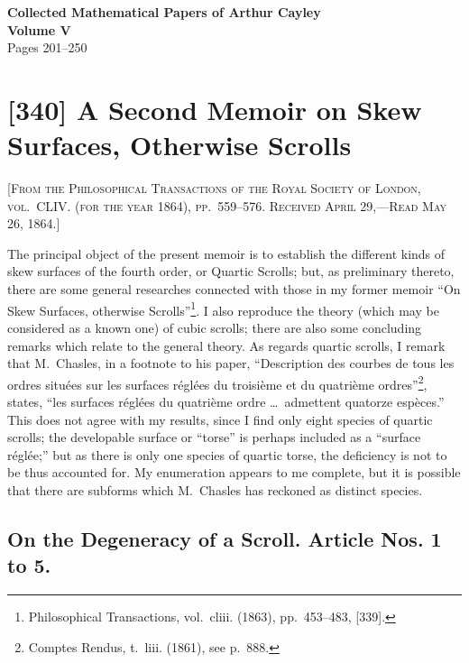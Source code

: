 \documentclass[12pt,a4paper]{article}
\theoremstyle{definition}
\begin{document}
\begin{center}
\LARGE\textbf{Collected Mathematical Papers of Arthur Cayley}\\[6pt]
\Large\textbf{Volume V}\\[12pt]
\large Pages 201--250\\[24pt]
\end{center}

\tableofcontents
\newpage

\section{[340] A Second Memoir on Skew Surfaces, Otherwise Scrolls}

\begin{center}
\textsc{[From the Philosophical Transactions of the Royal Society of London, vol.~CLIV. (for the year 1864), pp.~559--576. Received April 29,---Read May 26, 1864.]}
\end{center}

The principal object of the present memoir is to establish the different kinds of skew surfaces of the fourth order, or Quartic Scrolls; but, as preliminary thereto, there are some general researches connected with those in my former memoir ``On Skew Surfaces, otherwise Scrolls''\footnote{Philosophical Transactions, vol.~cliii. (1863), pp.~453--483, [339].}. I also reproduce the theory (which may be considered as a known one) of cubic scrolls; there are also some concluding remarks which relate to the general theory. As regards quartic scrolls, I remark that M.~Chasles, in a footnote to his paper, ``Description des courbes de tous les ordres situ\'{e}es sur les surfaces r\'{e}gl\'{e}es du troisi\`{e}me et du quatri\`{e}me ordres''\footnote{Comptes Rendus, t.~liii. (1861), see p.~888.}, states, ``les surfaces r\'{e}gl\'{e}es du quatri\`{e}me ordre \ldots\ admettent quatorze esp\`{e}ces.'' This does not agree with my results, since I find only eight species of quartic scrolls; the developable surface or ``torse'' is perhaps included as a ``surface r\'{e}gl\'{e}e;'' but as there is only one species of quartic torse, the deficiency is not to be thus accounted for. My enumeration appears to me complete, but it is possible that there are subforms which M.~Chasles has reckoned as distinct species.

\subsection*{On the Degeneracy of a Scroll. Article Nos. 1 to 5.}
\end{document}
